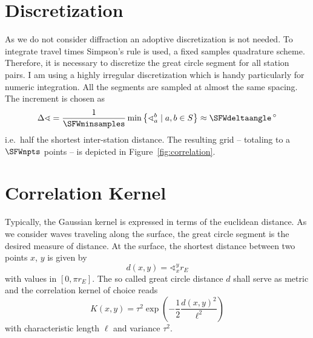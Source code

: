 \documentclass[11pt]{article}
\begin{document}
\section{Discretization}

As we do not consider diffraction an adoptive discretization is not needed.
To integrate travel times Simpson's rule is used, a fixed samples quadrature scheme.
Therefore, it is necessary to discretize the great circle segment for all station pairs.
I am using a highly irregular discretization which is handy particularly for numeric integration.
All the segments are sampled at almost the same spacing.
The increment is chosen as
\begin{equation}
    \Delta\sphericalangle = \frac 1 \SFWminsamples \min\left\{ \sphericalangle_a^b \mid a,b \in S \right\}
    \approx \SFWdeltaangle \,{}^\circ
\end{equation}
i.e.~half the shortest inter-station distance.
The resulting grid -- totaling to a $\SFWnpts$ points -- is depicted in Figure~\ref{fig:correlation}.


\section{Correlation Kernel}

Typically, the Gaussian kernel is expressed in terms of the euclidean distance.
As we consider waves traveling along the surface, the great circle segment is the desired measure of distance.
At the surface, the shortest distance between two points $x$, $y$ is given by
\begin{equation}
    d(x,y) = \sphericalangle_x^y r_E
\end{equation}
with values in $[0, \pi r_E]$.
The so called great circle distance $d$ shall serve as metric and the correlation kernel of choice reads
\begin{equation}
    K(x,y) = \tau^2 \exp\!\left(-\frac 12 \frac{d(x,y)^2}{\ell^2}\right)
\end{equation}
with characteristic length $\ell$ and variance $\tau^2$.
\end{document}
